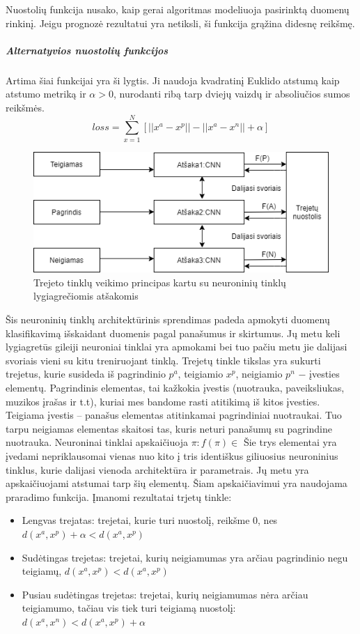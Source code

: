 \documentclass{VUMIFPSkursinis}
\begin{document}
Nuostolių funkcija nusako, kaip gerai algoritmas modeliuoja pasirinktą duomenų rinkinį. Jeigu prognozė rezultatui yra netiksli, ši funkcija grąžina didesnę reikšmę.

\subparagraph{Alternatyvios nuostolių funkcijos}
Artima šiai funkcijai yra ši lygtis. Ji naudoja kvadratinį Euklido \cite{Aerial_image_similarity} atstumą kaip atstumo metriką ir $\alpha > 0$, nurodanti ribą tarp dviejų vaizdų ir absoliučios sumos reikšmės.
\[loss = \sum_{x=1}^{N} [||x^a - x^p|| - ||x^a - x^n|| + \alpha]\]

\begin{figure}[H]
\centering
\includegraphics[scale=0.8]{img/Triplet_network_branchCNN}
\caption{Trejeto tinklų veikimo principas kartu su neuroninių tinklų lygiagrečiomis atšakomis} %
\label{img:mlp}
\end{figure}

Šis neuroninių tinklų architektūrinis sprendimas padeda apmokyti duomenų klasifikavimą išskaidant duomenis pagal panašumus ir skirtumus. Jų metu keli lygiagretūs gileiji neuroniai tinklai yra apmokami bei tuo pačiu metu jie dalijasi svoriais vieni su kitu treniruojant tinklą. Trejetų tinkle tikslas yra sukurti trejetus, kurie susideda iš pagrindinio $p^a$, teigiamio $x^p$, neigiamio $p^n$ − įvesties elementų. Pagrindinis elementas, tai kažkokia įvestis (nuotrauka, paveiksliukas, muzikos įrašas ir t.t), kuriai mes bandome rasti atitikimą iš kitos įvesties. Teigiama įvestis – panašus elementas atitinkamai pagrindiniai nuotraukai. Tuo tarpu neigiamas elementas skaitosi tas, kuris neturi panašumų su pagrindine nuotrauka. Neuroninai tinklai apskaičiuoja  $\pi : f(\pi) \in$
Šie trys elementai yra įvedami nepriklausomai vienas nuo kito į  tris identiškus giliuosius neuroninius tinklus, kurie dalijasi vienoda architektūra ir parametrais. Jų metu yra apskaičiuojami atstumai tarp šių elementų. Šiam apskaičiavimui yra naudojama praradimo funkcija.
\newline
Įmanomi rezultatai trjetų tinkle:
\begin{itemize}
\item{Lengvas trejatas: trejetai, kurie turi nuostolį, reikšme 0, nes $d(x^a, x^p) + \alpha < d(x^a, x^p)$}
\item{Sudėtingas trejetas: trejetai, kurių neigiamumas yra arčiau pagrindinio negu teigiamų, $d(x^a, x^p) < d(x^a, x^p)$}
\item{Pusiau sudėtingas trejetas: trejetai, kurių neigiamumas nėra arčiau teigiamumo, tačiau vis tiek turi teigiamą nuostolį: $d(x^a, x^n) < d(x^a, x^p) +\alpha$}
\end{itemize}
\end{document}

